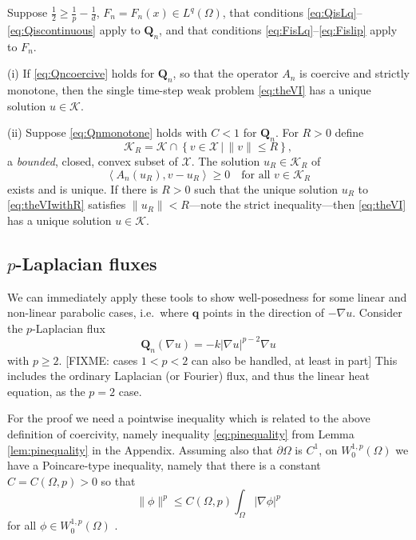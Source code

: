 \documentclass[final,leqno,onefignum,onetabnum]{siamltex1213bueler}
\newcommand\bq{\mathbf{q}}
\newcommand\bQ{\mathbf{Q}}
\renewcommand{\grad}{\nabla}
\newcommand{\ip}[2]{\ensuremath{\left<#1,#2\right>}}
\begin{document}
\medskip
\begin{theorem}  \label{thm:monowellposed}  Suppose $\frac{1}{2} \ge \frac{1}{p} - \frac{1}{d}$, $F_n=F_n(x)\in L^q(\Omega)$, that conditions \eqref{eq:QisLq}--\eqref{eq:Qiscontinuous} apply to $\bQ_n$, and that conditions \eqref{eq:FisLq}--\eqref{eq:Fislip} apply to $F_n$.

(i)  If \eqref{eq:Qncoercive} holds for $\bQ_n$, so that the operator $A_n$ is coercive and strictly monotone, then the single time-step weak problem \eqref{eq:theVI} has a unique solution $u\in\mathcal{K}$.

(ii) Suppose \eqref{eq:Qnmonotone} holds with $C<1$ for $\bQ_n$.  For $R>0$ define
    $$\mathcal{K}_R = \mathcal{K} \cap \left\{v\in \mathcal{X} \,\Big|\, \|v\|\le R\right\},$$
a \emph{bounded}, closed, convex subset of $\mathcal{X}$.  The solution $u_R\in \mathcal{K}_R$ of
\begin{equation}
  \ip{A_n(u_R)}{v-u_R} \ge 0 \quad \text{for all $v \in \mathcal{K}_R$} \label{eq:theVIwithR}
\end{equation}
exists and is unique.  If there is $R>0$ such that the unique solution $u_R$ to \eqref{eq:theVIwithR} satisfies $\|u_R\| < R$---note the strict inequality---then \eqref{eq:theVI} has a unique solution $u\in\mathcal{K}$.
\end{theorem}

\subsection{$p$-Laplacian fluxes} \label{subsec:plap}  We can immediately apply these tools to show well-posedness for some linear and non-linear parabolic cases, i.e.~where $\bq$ points in the direction of $-\grad u$.  Consider the $p$-Laplacian \cite{Evans} flux
\begin{equation}
  \bQ_n(\grad u) = - k |\grad u|^{p-2} \grad u \label{eq:plapflux}
\end{equation}
with $p\ge 2$.  [FIXME: cases $1<p<2$ can also be handled, at least in part]  This includes the ordinary Laplacian (or Fourier) flux, and thus the linear heat equation, as the $p=2$ case.

For the proof we need a pointwise inequality which is related to the above definition of coercivity, namely inequality \eqref{eq:pinequality} from Lemma \ref{lem:pinequality} in the Appendix.  Assuming also that $\partial \Omega$ is $C^1$, on $W_0^{1,p}(\Omega)$ we have a Poincare-type inequality, namely that there is a constant $C = C(\Omega,p)>0$ so that
\begin{equation}
  \|\phi\|^p \le C(\Omega,p) \int_\Omega |\grad \phi|^p  \label{eq:poincareequivalence}
\end{equation}
for all $\phi\in W_0^{1,p}(\Omega)$ \cite[theorem 5.6.3]{Evans}.
\end{document}
